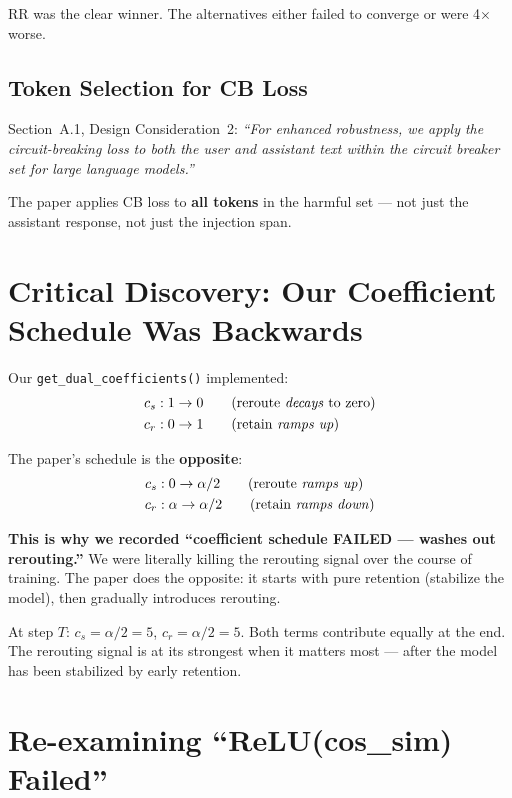 \documentclass[11pt]{article}
\begin{document}
RR was the clear winner. The alternatives either failed to converge or
were 4$\times$ worse.

\subsection{Token Selection for CB Loss}

Section~A.1, Design Consideration~2: \emph{``For enhanced robustness, we apply
the circuit-breaking loss to both the user and assistant text within the
circuit breaker set for large language models.''}

The paper applies CB loss to \textbf{all tokens} in the harmful set ---
not just the assistant response, not just the injection span.

\section{Critical Discovery: Our Coefficient Schedule Was Backwards}

Our \texttt{get\_dual\_coefficients()} implemented:
\begin{align*}
  c_s &: 1 \to 0 \qquad \text{(reroute \emph{decays} to zero)} \\
  c_r &: 0 \to 1 \qquad \text{(retain \emph{ramps up})}
\end{align*}

The paper's schedule is the \textbf{opposite}:
\begin{align*}
  c_s &: 0 \to \alpha/2 \qquad \text{(reroute \emph{ramps up})} \\
  c_r &: \alpha \to \alpha/2 \qquad \text{(retain \emph{ramps down})}
\end{align*}

\textbf{This is why we recorded ``coefficient schedule FAILED --- washes out
rerouting.''} We were literally killing the rerouting signal over the course of
training. The paper does the opposite: it starts with pure retention (stabilize
the model), then gradually introduces rerouting.

At step $T$: $c_s = \alpha/2 = 5$, $c_r = \alpha/2 = 5$. Both terms contribute
equally at the end. The rerouting signal is at its strongest when it matters
most --- after the model has been stabilized by early retention.

\section{Re-examining ``ReLU(cos\_sim) Failed''}
\end{document}
